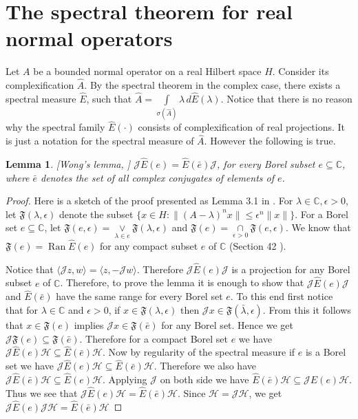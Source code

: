 \documentclass[12pt,a4paper,twoside]{article}
\numberwithin{equation}{section}
\theoremstyle{definition}  %
\theoremstyle{plain}  %
\newtheorem{lem}[defn]{Lemma}
\theoremstyle{remark} %
\DeclareMathOperator{\ran}{Ran}
\begin{document}
\section {The spectral theorem for  real normal operators}
Let $A$ be a bounded normal operator on a real Hilbert space
$H$. Consider its complexification $\hat{A}.$ By the
spectral theorem in the complex case, there exists a spectral
measure $\hat{E}$, such that $\hat{A} = \int
\limits_{\sigma(\hat{A})}\!\!\!\lambda \,d\hat{E}(\lambda)$. Notice that there is no reason why the spectral family $\hat{E}(\cdot )$ consists of complexification of real projections. It is just a notation for the spectral measure of $\hat{A}$. However the
following is true.
\begin{lem} \label{lem:wong}[Wong's lemma, \cite{Wong69}]
 $\mathcal{J}\hat{E}(e) = \hat{E}(\bar{e})\mathcal{J}$, for every Borel subset $e \subseteq \mathbb{C}$, where $\bar{e}$ denotes the set of all complex conjugates of elements of $e$.
\end{lem}
\begin{proof} Here is a sketch of the proof presented as
 Lemma 3.1 in \cite{Wong69}. For $\lambda \in \mathbb{C}, \epsilon >0$, let $\mathfrak{F}(\lambda,\epsilon)$ denote the subset $\{x \in H \colon \|(A-\lambda)^n x\| \leq \epsilon^n \|x\|\}$. For a Borel set $e\subseteq \mathbb{C}$, let $\mathfrak{F}(e,\epsilon ) = \underset{\lambda \in e}{\vee}\mathfrak{F}(\lambda,\epsilon )$ and $\mathfrak{F}(e)=\underset{\epsilon >0}{\cap}\mathfrak{F}(e,\epsilon )$.  We know that $\mathfrak{F}(e) = \ran \hat{E}(e)$ for any compact subset $e$ of $\mathbb{C}$ (Section 42 \cite{Hal98}). 
 
 
 Notice that $\langle \mathcal{J}z,w\rangle = \langle z,-\mathcal{J}w\rangle$. Therefore $\mathcal{J}\hat{E}(e)\mathcal{J}$ is a projection for any Borel subset $e$ of $\mathbb{C}$. Therefore, to prove the lemma it is enough to show that $\mathcal{J}\hat{E}(e)\mathcal{J}$ and $\hat{E}(\bar{e})$ have the same range for every Borel set $e$. To this end first notice that for $\lambda \in \mathbb{C}$ and $\epsilon >0$, if $x \in \mathfrak{F}(\lambda,\epsilon)$ then $\mathcal{J}x \in \mathfrak{F}(\bar{\lambda},\epsilon)$. From this it follows that  $x \in \mathfrak{F}(e)$ implies $\mathcal{J}x \in \mathfrak{F}(\bar{e})$ for any Borel set. Hence we get $\mathcal{J}\mathfrak{F}(e) \subseteq \mathfrak{F}(\bar{e})$. Therefore for a compact Borel set $e$  we have $\mathcal{J}\hat{E}(e)\mathcal{H} \subseteq \hat{E}(\bar{e})\mathcal{H}$. Now by regularity of the spectral measure  if $e$ is a Borel set we have $\mathcal{J}\hat{E}(e)\mathcal{H} \subseteq \hat{E}(\bar{e})\mathcal{H}$. Therefore we also have $\mathcal{J}\hat{E}(\bar{e})\mathcal{H} \subseteq \hat{E}(e)\mathcal{H}$. Applying $\mathcal{J}$ on both side we have $\hat{E}(\bar{e})\mathcal{H} \subseteq \mathcal{J}\hat{E}(e)\mathcal{H}$. Thus we see that $\mathcal{J}\hat{E}(e)\mathcal{H} = \hat{E}(\bar{e})\mathcal{H}$. Since $\mathcal{H} = \mathcal{J}\mathcal{H}$, we get  $\mathcal{J}\hat{E}(e)\mathcal{J}\mathcal{H} = \hat{E}(\bar{e})\mathcal{H}$
 
\end{proof}
\end{document}
